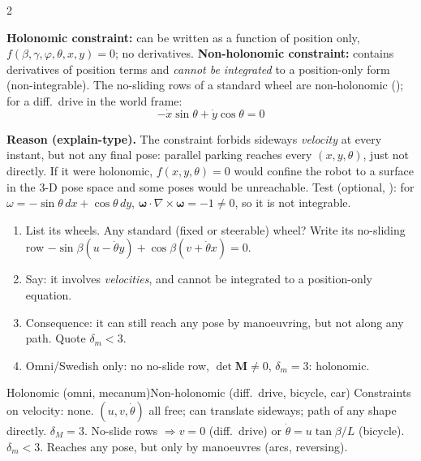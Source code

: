 \begin{multicols}{2}
\begin{fbx}[Definitions \pg{66--68}]
\textbf{Holonomic constraint:} can be written as a function of position only, $f(\beta,\gamma,\varphi,\theta,x,y)=0$; no derivatives. \textbf{Non-holonomic constraint:} contains derivatives of position terms and \emph{cannot be integrated} to a position-only form (non-integrable). The no-sliding rows of a standard wheel are non-holonomic (); for a diff.\ drive in the world frame:
\[-\dot x\sin\theta+\dot y\cos\theta=0\]
\end{fbx}
\textbf{Reason (explain-type).} The constraint forbids sideways \emph{velocity} at every instant, but not any final pose: parallel parking reaches every $(x,y,\theta)$, just not directly. If it were holonomic, $f(x,y,\theta)=0$ would confine the robot to a surface in the 3-D pose space and some poses would be unreachable. Test (optional, \added): for $\omega=-\sin\theta\,dx+\cos\theta\,dy$, $\boldsymbol\omega\cdot\nabla\times\boldsymbol\omega=-1\neq0$, so it is not integrable. \chk
\begin{recipe}
\begin{enumerate}
\item List its wheels. Any standard (fixed or steerable) wheel? Write its no-sliding row $-\sin\beta(u-\dot\theta y)+\cos\beta(v+\dot\theta x)=0$.
\item Say: it involves \emph{velocities}, and cannot be integrated to a position-only equation.
\item Consequence: it can still reach any pose by manoeuvring, but not along any path. Quote $\delta_m<3$.
\item Omni/Swedish only: no no-slide row, $\det\mathbf M\neq0$, $\delta_m=3$: holonomic.
\end{enumerate}
\end{recipe}
\begin{twoway}{Holonomic (omni, mecanum)}{Non-holonomic (diff.\ drive, bicycle, car)}
Constraints on velocity: none. $(u,v,\dot\theta)$ all free; can translate sideways; path of any shape directly. $\delta_M=3$.
\tcblower
No-slide rows $\Rightarrow v=0$ (diff.\ drive) or $\dot\theta=u\tan\beta/L$ (bicycle). $\delta_m<3$. Reaches any pose, but only by manoeuvres (arcs, reversing).
\end{twoway}


\end{multicols}
